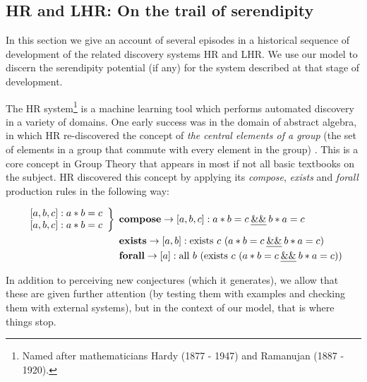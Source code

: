 \subsection{{\sf HR} and {\sf LHR}: On the trail of serendipity} \label{sec:pursuit}

In this section we give an account of several episodes in a historical sequence of development of the related discovery systems {\sf HR} and {\sf LHR}. We use our model to discern the serendipity potential (if any) for the system described at that stage of development.

\begin{ep}\label{ex:central}
The {\sf HR} system\footnote{Named after mathematicians Hardy (1877 - 1947) and Ramanujan (1887 - 1920).} \citet{colton2002automated} is a machine learning tool which performs automated discovery in a variety of domains. 
One early success was in the domain of abstract algebra, in which {\sf HR} re-discovered the concept of \emph{the central elements of a group} (the set of elements in a group that commute with every element in the group) \cite{colton2002automated}.  This is a core concept in Group Theory that appears in most if not all basic textbooks on the subject.  HR discovered this concept by applying its {\em compose}, {\em exists} and {\em forall} production rules in the following way:  

\begin{align*}
\left.
\begin{array}{c}
{[}a,b,c{]} : a*b=c\\
{[}a,b,c{]} : a*b=c
\end{array}
\right\}\:\:
&\mathbf{compose}\rightarrow [a,b,c] : a*b=c \:\text{\emph{\&\&}}\: b*a=c\\
&\mathbf{exists}\rightarrow [a,b] : \text{exists}\ c\ (a*b=c \:\text{\emph{\&\&}}\: b*a=c)\\
&\mathbf{forall}\rightarrow [a] : \text{all}\ b\ (\text{exists}\ c\ (a*b=c \:\text{\emph{\&\&}}\: b*a=c))
\end{align*}
\end{ep}

In addition to perceiving new conjectures (which it generates), we allow that these are given further attention (by testing them with examples and checking them with external systems), but in the context of our model, that is where things stop.

